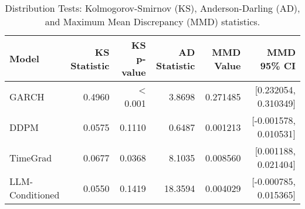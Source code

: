 \begin{table}[htbp]
\centering
\begin{tabular}{lrrrrr}
\toprule
Model & KS Statistic & KS p-value & AD Statistic & MMD Value & MMD 95\% CI \\
\midrule
GARCH & 0.4960 & < 0.001 & 3.8698 & 0.271485 & [0.232054, 0.310349] \\
DDPM & 0.0575 & 0.1110 & 0.6487 & 0.001213 & [-0.001578, 0.010531] \\
TimeGrad & 0.0677 & 0.0368 & 8.1035 & 0.008560 & [0.001188, 0.021404] \\
LLM-Conditioned & 0.0550 & 0.1419 & 18.3594 & 0.004029 & [-0.000785, 0.015365] \\
\bottomrule
\end{tabular}
\caption{Distribution Tests: Kolmogorov-Smirnov (KS), Anderson-Darling (AD), and Maximum Mean Discrepancy (MMD) statistics.}
\label{tab:distribution_tests}
\end{table}
